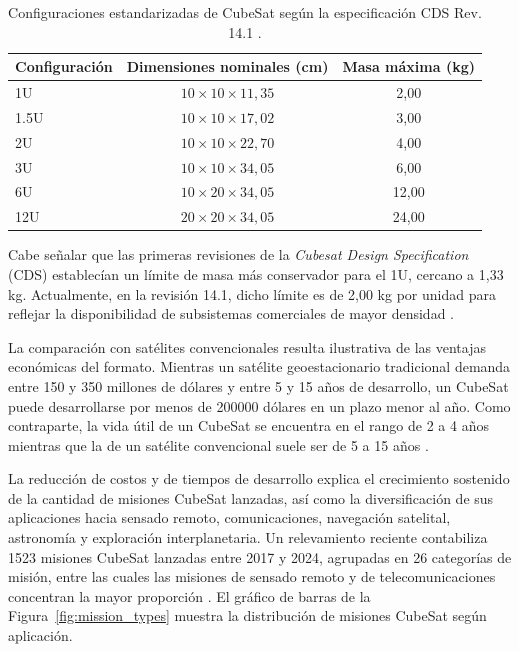 \begin{table}[htbp]
    \centering
    \caption{Configuraciones estandarizadas de CubeSat según la especificación CDS Rev. 14.1 \cite{cubesatspecs}.}
    \label{tab:cubesat_units}
    \renewcommand{\arraystretch}{1.1}
    \begin{tabular}{lcc}
        \hline\hline
        \textbf{Configuración} & \textbf{Dimensiones nominales (cm)} & \textbf{Masa máxima (kg)} \\
        \hline
        1U   & $10 \times 10 \times 11,35$ & 2,00  \\
        1.5U & $10 \times 10 \times 17,02$ & 3,00  \\
        2U   & $10 \times 10 \times 22,70$ & 4,00  \\
        3U   & $10 \times 10 \times 34,05$ & 6,00  \\
        6U   & $10 \times 20 \times 34,05$ & 12,00 \\
        12U  & $20 \times 20 \times 34,05$ & 24,00 \\
        \hline\hline
    \end{tabular}
\end{table}

Cabe señalar que las primeras revisiones de la \textit{Cubesat Design Specification} (CDS) establecían un límite de masa más conservador para el 1U, cercano a 1,33 kg. Actualmente, en la revisión 14.1, dicho límite es de 2,00 kg por unidad para reflejar la disponibilidad de subsistemas comerciales de mayor densidad \cite{cubesatspecs}.

La comparación con satélites convencionales resulta ilustrativa de las ventajas económicas del formato. Mientras un satélite geoestacionario tradicional demanda entre 150 y 350 millones de dólares y entre 5 y 15 años de desarrollo, un CubeSat puede desarrollarse por menos de 200000 dólares en un plazo menor al año. Como contraparte, la vida útil de un CubeSat se encuentra en el rango de 2 a 4 años mientras que la de un satélite convencional suele ser de 5 a 15 años \cite{zeedan2023}. 

La reducción de costos y de tiempos de desarrollo explica el crecimiento sostenido de la cantidad de misiones CubeSat lanzadas, así como la diversificación de sus aplicaciones hacia sensado remoto, comunicaciones, navegación satelital, astronomía y exploración interplanetaria. Un relevamiento reciente contabiliza 1523 misiones CubeSat lanzadas entre 2017 y 2024, agrupadas en 26 categorías de misión, entre las cuales las misiones de sensado remoto y de telecomunicaciones concentran la mayor proporción \cite{tubbal2025}. El gráfico de barras de la Figura~\ref{fig:mission_types} muestra la distribución de misiones CubeSat según aplicación.

